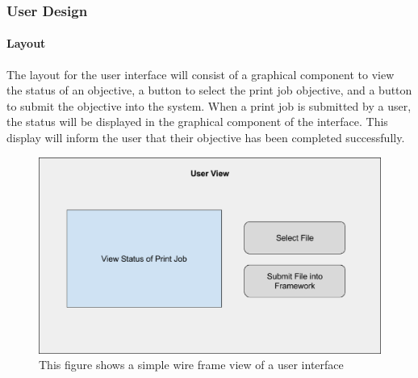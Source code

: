\documentclass[draftclsnofoot, onecolumn, compsoc, 10pt]{IEEEtran}
\begin{document}
\subsubsection{User Design}
\paragraph{Layout}
The layout for the user interface will consist of a graphical component to view the status of an objective, a button to select the print job objective, and a button to submit the objective into the system. When a print job is submitted by a user, the status will be displayed in the graphical component of the interface. This display will inform the user that their objective has been completed successfully. 
\begin{figure}[H]
\centering
\includegraphics[scale=0.4]{user}
\captionsetup{justification=centering}
\caption{This figure shows a simple wire frame view of a user interface}
\end{figure}
\end{document}
